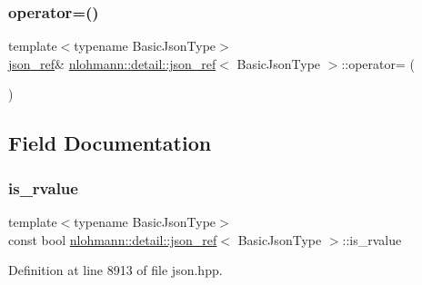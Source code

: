 \subsubsection{\texorpdfstring{operator=()}{operator=()}}
{\footnotesize\ttfamily template$<$typename Basic\+Json\+Type$>$ \\
\hyperlink{classnlohmann_1_1detail_1_1json__ref}{json\+\_\+ref}\& \hyperlink{classnlohmann_1_1detail_1_1json__ref}{nlohmann\+::detail\+::json\+\_\+ref}$<$ Basic\+Json\+Type $>$\+::operator= (\begin{DoxyParamCaption}\item[{const \hyperlink{classnlohmann_1_1detail_1_1json__ref}{json\+\_\+ref}$<$ Basic\+Json\+Type $>$ \&}]{ }\end{DoxyParamCaption})\hspace{0.3cm}{\ttfamily [delete]}}



\subsection{Field Documentation}
\mbox{\label{classnlohmann_1_1detail_1_1json__ref_a434d1e18c21cc1b61954ba22b62ee7a5}} 
\subsubsection{\texorpdfstring{is\+\_\+rvalue}{is\_rvalue}}
{\footnotesize\ttfamily template$<$typename Basic\+Json\+Type$>$ \\
const bool \hyperlink{classnlohmann_1_1detail_1_1json__ref}{nlohmann\+::detail\+::json\+\_\+ref}$<$ Basic\+Json\+Type $>$\+::is\+\_\+rvalue\hspace{0.3cm}{\ttfamily [private]}}



Definition at line 8913 of file json.\+hpp.

\mbox{\label{classnlohmann_1_1detail_1_1json__ref_a5d7bd67a5ab713d9be1e248cf9d509cd}} 
